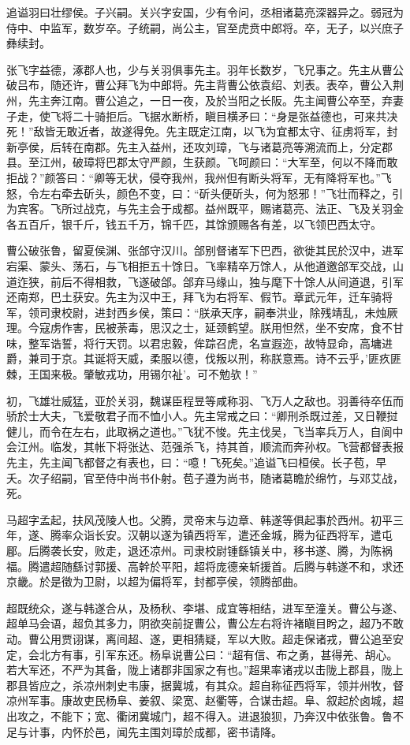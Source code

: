 \documentclass[12pt,UTF8]{ctexbook}
\begin{document}
追谥羽曰壮缪侯。子兴嗣。关兴字安国，少有令问，丞相诸葛亮深器异之。弱冠为侍中、中监军，数岁卒。子统嗣，尚公主，官至虎贲中郎将。卒，无子，以兴庶子彝续封。

张飞字益德，涿郡人也，少与关羽俱事先主。羽年长数岁，飞兄事之。先主从曹公破吕布，随还许，曹公拜飞为中郎将。先主背曹公依袁绍、刘表。表卒，曹公入荆州，先主奔江南。曹公追之，一日一夜，及於当阳之长阪。先主闻曹公卒至，弃妻子走，使飞将二十骑拒后。飞据水断桥，瞋目横矛曰：“身是张益德也，可来共决死！”敌皆无敢近者，故遂得免。先主既定江南，以飞为宜都太守、征虏将军，封新亭侯，后转在南郡。先主入益州，还攻刘璋，飞与诸葛亮等溯流而上，分定郡县。至江州，破璋将巴郡太守严颜，生获颜。飞呵颜曰：“大军至，何以不降而敢拒战？”颜答曰：“卿等无状，侵夺我州，我州但有断头将军，无有降将军也。”飞怒，令左右牵去斫头，颜色不变，曰：“斫头便斫头，何为怒邪！”飞壮而释之，引为宾客。飞所过战克，与先主会于成都。益州既平，赐诸葛亮、法正、飞及关羽金各五百斤，银千斤，钱五千万，锦千匹，其馀颁赐各有差，以飞领巴西太守。

曹公破张鲁，留夏侯渊、张郃守汉川。郃别督诸军下巴西，欲徙其民於汉中，进军宕渠、蒙头、荡石，与飞相拒五十馀日。飞率精卒万馀人，从他道邀郃军交战，山道迮狭，前后不得相救，飞遂破郃。郃弃马缘山，独与麾下十馀人从间道退，引军还南郑，巴土获安。先主为汉中王，拜飞为右将军、假节。章武元年，迁车骑将军，领司隶校尉，进封西乡侯，策曰：“朕承天序，嗣奉洪业，除残靖乱，未烛厥理。今寇虏作害，民被荼毒，思汉之士，延颈鹤望。朕用怛然，坐不安席，食不甘味，整军诰誓，将行天罚。以君忠毅，侔踪召虎，名宣遐迩，故特显命，高墉进爵，兼司于京。其诞将天威，柔服以德，伐叛以刑，称朕意焉。诗不云乎，'匪疚匪棘，王国来极。肇敏戎功，用锡尔祉'。可不勉欤！”

初，飞雄壮威猛，亚於关羽，魏谋臣程昱等咸称羽、飞万人之敌也。羽善待卒伍而骄於士大夫，飞爱敬君子而不恤小人。先主常戒之曰：“卿刑杀既过差，又日鞭挝健儿，而令在左右，此取祸之道也。”飞犹不悛。先主伐吴，飞当率兵万人，自阆中会江州。临发，其帐下将张达、范强杀飞，持其首，顺流而奔孙权。飞营都督表报先主，先主闻飞都督之有表也，曰：“噫！飞死矣。”追谥飞曰桓侯。长子苞，早夭。次子绍嗣，官至侍中尚书仆射。苞子遵为尚书，随诸葛瞻於绵竹，与邓艾战，死。

马超字孟起，扶风茂陵人也。父腾，灵帝末与边章、韩遂等俱起事於西州。初平三年，遂、腾率众诣长安。汉朝以遂为镇西将军，遣还金城，腾为征西将军，遣屯郿。后腾袭长安，败走，退还凉州。司隶校尉锺繇镇关中，移书遂、腾，为陈祸福。腾遣超随繇讨郭援、高幹於平阳，超将庞德亲斩援首。后腾与韩遂不和，求还京畿。於是徵为卫尉，以超为偏将军，封都亭侯，领腾部曲。

超既统众，遂与韩遂合从，及杨秋、李堪、成宜等相结，进军至潼关。曹公与遂、超单马会语，超负其多力，阴欲突前捉曹公，曹公左右将许褚瞋目盻之，超乃不敢动。曹公用贾诩谋，离间超、遂，更相猜疑，军以大败。超走保诸戎，曹公追至安定，会北方有事，引军东还。杨阜说曹公曰：“超有信、布之勇，甚得羌、胡心。若大军还，不严为其备，陇上诸郡非国家之有也。”超果率诸戎以击陇上郡县，陇上郡县皆应之，杀凉州刺史韦康，据冀城，有其众。超自称征西将军，领并州牧，督凉州军事。康故吏民杨阜、姜叙、梁宽、赵衢等，合谋击超。阜、叙起於卤城，超出攻之，不能下；宽、衢闭冀城门，超不得入。进退狼狈，乃奔汉中依张鲁。鲁不足与计事，内怀於邑，闻先主围刘璋於成都，密书请降。
\end{document}
